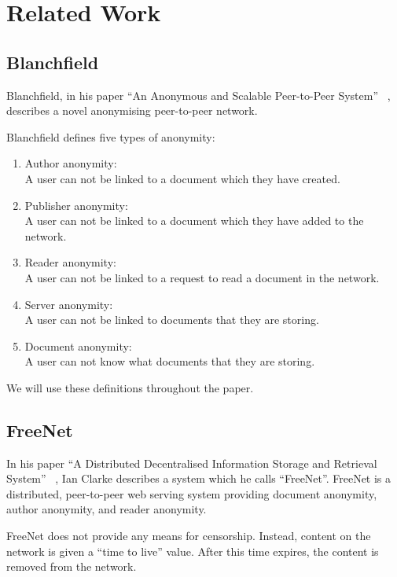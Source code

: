 \chapter{Related Work}

\section{Blanchfield}

Blanchfield, in his paper “An Anonymous and Scalable Peer-to-Peer System” ~\cite{blanchfield},
describes a novel anonymising peer-to-peer network.

Blanchfield defines five types of anonymity:
\begin{enumerate}
    \item{Author anonymity: \\
        A user can not be linked to a document which they have created.
    }
    \item{Publisher anonymity: \\
        A user can not be linked to a document which they have added to the network.
    }
    \item{Reader anonymity: \\
        A user can not be linked to a request to read a document in the network.
    }
    \item{Server anonymity: \\
        A user can not be linked to documents that they are storing.
    }
    \item{Document anonymity: \\
        A user can not know what documents that they are storing.
    }
\end{enumerate}

We will use these definitions throughout the paper.

\section{FreeNet}

In his paper “A Distributed Decentralised Information Storage and Retrieval System” ~\cite{freenet},
Ian Clarke describes a system which he calls “FreeNet”. FreeNet is a distributed, peer-to-peer web
serving system providing document anonymity, author anonymity, and reader anonymity.

FreeNet does not provide any means for censorship. Instead, content on the network is given a
“time to live” value. After this time expires, the content is removed from the network.

